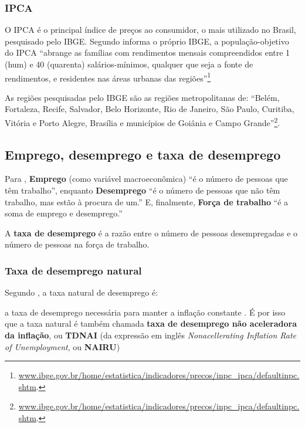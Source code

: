 \documentclass[
	10pt,				%
	openright,			%
	twoside,			%
	a5paper,			%
	english,			%
	french,				%
	spanish,			%
	brazil				%
	]{abntex2}
\renewenvironment{quote}
  {\small\list{}{\rightmargin=0.1cm \leftmargin=4cm}%
   \item\relax}
  {\endlist}
\begin{document}
\subsubsection{IPCA}\label{subsubsec:IPCA}

O IPCA é o principal índice de preços ao consumidor, o mais utilizado no
Brasil, pesquisado pelo IBGE. Segundo informa o próprio IBGE, a
população-objetivo do IPCA ``abrange as famílias com rendimentos mensais
compreendidos entre 1 (hum) e 40 (quarenta) salários-mínimos, qualquer
que seja a fonte de rendimentos, e residentes nas áreas urbanas das
regiões''\footnote{\href{http://www.ibge.gov.br/home/estatistica/indicadores/precos/inpc_ipca/defaultinpc.shtm}{www.ibge.gov.br/home/estatistica/indicadores/precos/inpc\_ipca/defaultinpc.shtm}.}

As regiões pesquisadas pelo IBGE são as regiões metropolitanas de:
``Belém, Fortaleza, Recife, Salvador, Belo Horizonte, Rio de Janeiro,
São Paulo, Curitiba, Vitória e Porto Alegre, Brasília e municípios de
Goiânia e Campo Grande''\footnote{\href{http://www.ibge.gov.br/home/estatistica/indicadores/precos/inpc_ipca/defaultinpc.shtm}{www.ibge.gov.br/home/estatistica/indicadores/precos/inpc\_ipca/defaultinpc.shtm}.}.

\subsection{Emprego, desemprego e taxa de
desemprego}\label{emprego-desemprego-e-taxa-de-desemprego}

Para , \textbf{Emprego} (como variável
macroeconômica) ``é o número de pessoas que têm trabalho'', enquanto
\textbf{Desemprego} ``é o número de pessoas que não têm trabalho, mas
estão à procura de um.'' E, finalmente, \textbf{Força de trabalho} ``é a
soma de emprego e desemprego.''

A \textbf{taxa de desemprego} é a razão entre o número de pessoas
desempregadas e o número de pessoas na força de trabalho.

\subsubsection{Taxa de desemprego
natural}\label{taxa-de-desemprego-natural}

Segundo , a taxa natural de desemprego é:

\begin{quote}
a taxa de desemprego necessária para manter a inflação constante . É por
isso que a taxa natural é também chamada \textbf{taxa de desemprego não
aceleradora da inflação}, ou \textbf{TDNAI} (da expressão em inglês
\emph{Nonacellerating Inflation Rate of Unemployment}, ou
\textbf{NAIRU})
\end{quote}
\end{document}
